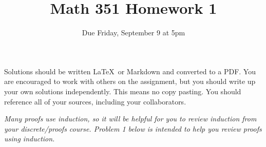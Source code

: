 \documentclass{article}
\title{Math 351 Homework 1}
\author{Due Friday, September 9 at 5pm}
\date{}
\begin{document}

\maketitle

\setlength{\parindent}{0em} %
\setlength{\parskip}{1em} %



Solutions should be written \LaTeX\ or Markdown and converted to a PDF. You are encouraged to work with others
on the assignment, but you should write up your own solutions independently. This means no copy pasting. You should
reference all of your sources, including your collaborators. 

{\it Many proofs use induction, so it will be helpful for you to review induction from
your discrete/proofs course. Problem 1 below is intended to help you review proofs using induction.}
\end{document}
